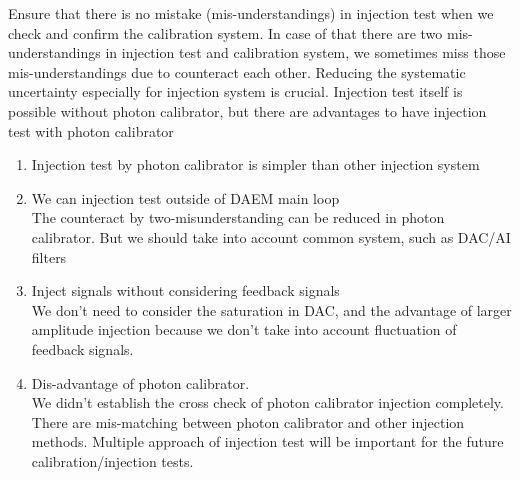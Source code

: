 Ensure that there is no mistake (mis-understandings) in injection test 
when we check and confirm the calibration system.
In case of that there are two mis-understandings in injection test and calibration system, 
we sometimes miss those mis-understandings due to counteract each other. 
Reducing the systematic uncertainty especially for injection system is crucial.
Injection test itself is possible without photon calibrator, 
but there are advantages to have injection test with photon calibrator
\begin{enumerate}
\item Injection test by photon calibrator is simpler than other injection system\\
\item We can injection test outside of DAEM main loop\\
The counteract by two-misunderstanding can be reduced in photon calibrator.
But we should take into account common system, such as DAC/AI filters\\
\item Inject signals without considering feedback signals\\
We don't need to consider the saturation in DAC, and the advantage of larger amplitude injection 
because we don't take into account fluctuation of feedback signals.\\
\item Dis-advantage of photon calibrator.\\
We didn't establish the cross check of photon calibrator injection completely. 
There are mis-matching between photon calibrator and other injection methods.
Multiple approach of injection test will be important for the future calibration/injection tests. 
\end{enumerate}


